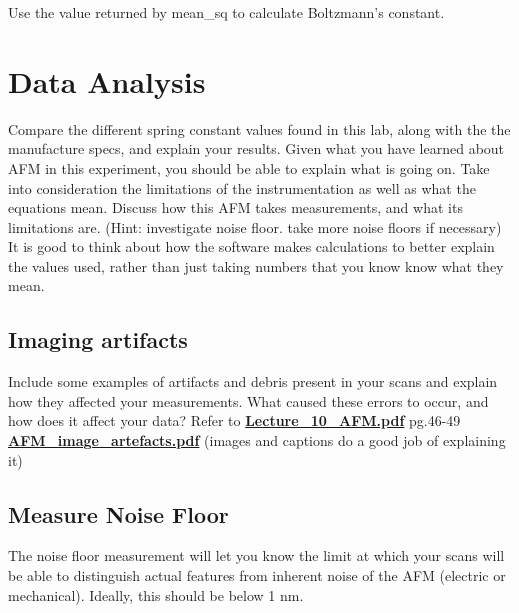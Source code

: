 \documentclass{../lab}
\begin{document}
Use the value returned by mean\_sq to calculate Boltzmann’s constant.

\section{Data Analysis}
Compare the different spring constant values found in this lab, along with the the manufacture specs, and explain your results.  Given what you have learned about AFM in this experiment, you should be able to explain what is going on.
Take into consideration the limitations of the instrumentation as well as what the equations mean.  Discuss how this AFM takes measurements, and what its limitations are.   (Hint: investigate noise floor. take more noise floors if necessary)
It is good to think about how the software makes calculations to better explain the values used, rather than just taking numbers that you know know what they mean.


\subsection{Imaging artifacts}
Include some examples of  artifacts and debris present in your scans and explain how they affected your measurements.  What caused these errors to occur, and how does it affect your data?
Refer to \href{http://experimentationlab.berkeley.edu/sites/default/files/AFMImages/Lecture\_10\_AFM.pdf}{\textbf{Lecture\_10\_AFM.pdf}}  pg.46-49
         \href{http://experimentationlab.berkeley.edu/sites/default/files/AFMImages/AFM\_image\_artefacts.pdf}{\textbf{AFM\_image\_artefacts.pdf}} (images and captions do a good job of explaining it)

\subsection{Measure Noise Floor}
The noise floor measurement will let you know the limit at which your scans will be able to distinguish actual features from inherent noise of the AFM (electric or mechanical).  Ideally, this should be below 1 nm.
\end{document}
